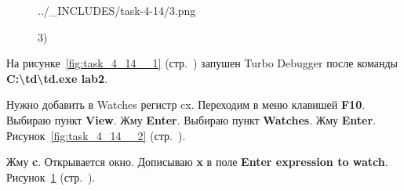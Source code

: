 \begin{figure}[!htp]
\begin {minipage}{0.32\textwidth}
            {../_INCLUDES/task-4-14/3.png}
        \caption{3) }
        \label{fig:task_4_14__3}
    \end{minipage}
\end{figure}

На рисунке~\ref{fig:task_4_14__1} (стр.~\pageref{fig:task_4_14__1})
запушен Turbo Debugger после команды
\textbf{C:\textbackslash\/td\textbackslash\/td.exe lab2}.

Нужно добавить в Watches регистр cx.
Переходим в меню клавишей \textbf{F10}.
Выбираю пункт \textbf{View}.
Жму \textbf{Enter}.
Выбираю пункт \textbf{Watches}.
Жму \textbf{Enter}.
Рисунок~\ref{fig:task_4_14__2} (стр.~\pageref{fig:task_4_14__2}).

Жму \textbf{c}.
Открывается окно.
Дописываю \textbf{x} в поле \textbf{Enter expression to watch}.
Рисунок~\ref{fig:task_4_14__3} (стр.~\pageref{fig:task_4_14__3}).

